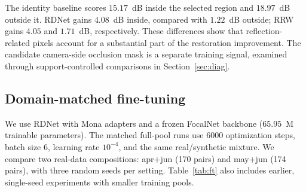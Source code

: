 The identity baseline scores $15.17$~dB inside the selected
region and $18.97$~dB outside it. RDNet gains $4.08$~dB
inside, compared with $1.22$~dB outside; RRW gains
$4.05$ and $1.71$~dB, respectively. These differences
show that reflection-related pixels account for a
substantial part of the restoration improvement. The
candidate camera-side occlusion mask is a separate
training signal, examined through support-controlled
comparisons in Section~\ref{sec:diag}.

\subsection{Domain-matched fine-tuning}
\label{sec:ft}

We use RDNet with Mona adapters and a frozen FocalNet backbone
($65.95$~M trainable parameters). The matched full-pool runs
use 6000 optimization steps, batch size 6, learning rate
$10^{-4}$, and the same real/synthetic mixture. We compare
two real-data compositions: apr+jun (170 pairs) and may+jun
(174 pairs), with three random seeds per setting.
Table~\ref{tab:ft} also includes earlier, single-seed
experiments with smaller training pools.


